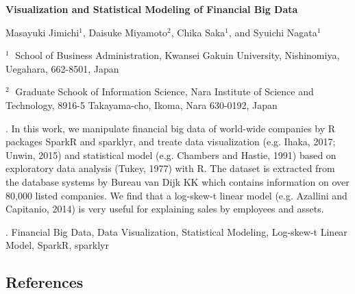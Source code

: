 \documentclass[12pt]{article}
\begin{document}
\begin{flushleft}


{\LARGE\bf Visualization and Statistical Modeling of Financial Big Data}


\vspace{1.0cm}

Masayuki Jimichi$^1$, Daisuke Miyamoto$^2$, Chika Saka$^1$, and Syuichi Nagata$^1$


\begin{description}

\item $^1 \;$ 
School of Business Administration, Kwansei Gakuin University, 
Nishinomiya, Uegahara, 
662-8501, 
Japan

\item $^2 \;$ Graduate Schook of Information Science, Nara Institute of Science and Technology, 
8916-5 Takayama-cho, Ikoma, Nara 630-0192, Japan

\end{description}

\end{flushleft}

\vspace{0.75cm}

. 
In this work, we manipulate financial big data of world-wide companies by R packages SparkR and sparklyr, 
and treate data visualization (e.g. Ihaka, 2017;  Unwin, 2015) and statistical model (e.g. Chambers and Hastie, 1991) based on exploratory data analysis (Tukey, 1977) with R. The dataset is extracted from the database systems by Bureau van Dijk KK which contains information on over 80,000 listed companies. 
We find that a log-skew-t linear model (e.g. Azallini and Capitanio, 2014) is very useful for explaining sales by employees and assets.

\vskip 2mm

.
Financial Big Data, Data Visualization, Statistical Modeling, Log-skew-t Linear Model, SparkR, sparklyr

\subsection*{References}
\end{document}
